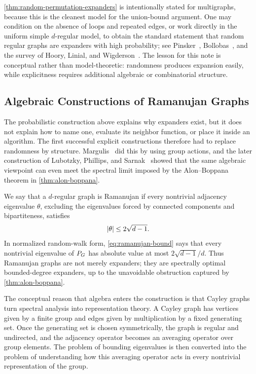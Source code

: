 \cref{thm:random-permutation-expanders} is intentionally stated for multigraphs, because this is the cleanest model for the union-bound argument. One may condition on the absence of loops and repeated edges, or work directly in the uniform simple \(d\)-regular model, to obtain the standard statement that random regular graphs are expanders with high probability; see Pinsker~\cite{Pin1973}, Bollobas~\cite{Bol1988}, and the survey of Hoory, Linial, and Wigderson~\cite{HLW2006}. The lesson for this note is conceptual rather than model-theoretic: randomness produces expansion easily, while explicitness requires additional algebraic or combinatorial structure.

\subsection{Algebraic Constructions of Ramanujan Graphs}
\label{subsec:ramanujan}

The probabilistic construction above explains why expanders exist, but it does not explain how to name one, evaluate its neighbor function, or place it inside an algorithm. The first successful explicit constructions therefore had to replace randomness by structure. Margulis~\cite{Mar1973} did this by using group actions, and the later construction of Lubotzky, Phillips, and Sarnak~\cite{LPS1988} showed that the same algebraic viewpoint can even meet the spectral limit imposed by the Alon--Boppana theorem in \cref{thm:alon-boppana}.

We say that a \(d\)-regular graph is Ramanujan if every nontrivial adjacency eigenvalue \(\theta\), excluding the eigenvalues forced by connected components and bipartiteness, satisfies
\begin{equation}
	\label{eq:ramanujan-bound}
	\lvert\theta\rvert\leq 2\sqrt{d-1}.
\end{equation}
In normalized random-walk form, \cref{eq:ramanujan-bound} says that every nontrivial eigenvalue of \(P_{G}\) has absolute value at most \(2\sqrt{d-1}/d\). Thus Ramanujan graphs are not merely expanders; they are spectrally optimal bounded-degree expanders, up to the unavoidable obstruction captured by \cref{thm:alon-boppana}.

The conceptual reason that algebra enters the construction is that Cayley graphs turn spectral analysis into representation theory. A Cayley graph has vertices given by a finite group and edges given by multiplication by a fixed generating set. Once the generating set is chosen symmetrically, the graph is regular and undirected, and the adjacency operator becomes an averaging operator over group elements. The problem of bounding eigenvalues is then converted into the problem of understanding how this averaging operator acts in every nontrivial representation of the group.

